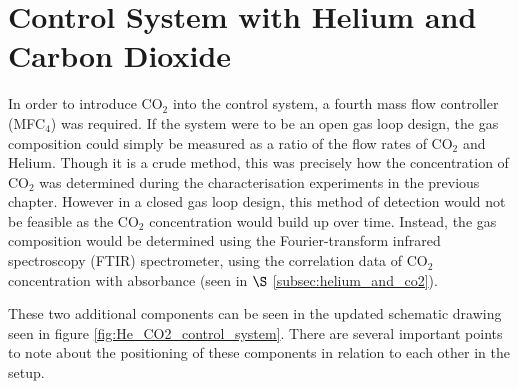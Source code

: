 \pagebreak




%

\section{Control System with Helium and Carbon Dioxide}

In order to introduce CO$_2$ into the control system, a fourth  mass flow controller (MFC$_4$) was required. If the system were to be an open gas loop design, the gas composition could simply be measured as a ratio of the flow rates of CO$_2$ and Helium. Though it is a crude method, this was precisely how the concentration of CO$_2$ was determined during the characterisation experiments in the previous chapter. However in a closed gas loop design, this method of detection would not be feasible as the CO$_2$ concentration would build up over time. Instead, the gas composition would be determined using the Fourier-transform infrared spectroscopy (FTIR) spectrometer, using the correlation data of CO$_2$ concentration with absorbance (seen in $\S$ \ref{subsec:helium_and_co2}). 

These two additional components can be seen in the updated schematic drawing seen in figure \ref{fig:He_CO2_control_system}. There are several important points to note about the positioning of these components in relation to each other in the setup. 

